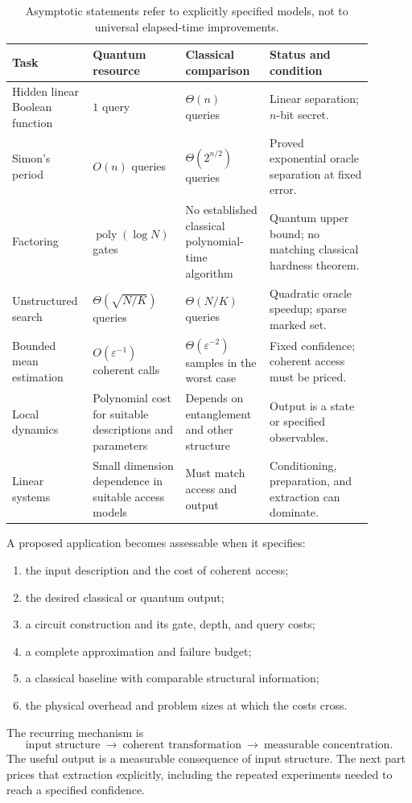 \documentclass[11pt,a4paper]{article}
\newcommand{\poly}{\operatorname{poly}}
\theoremstyle{definition}
\theoremstyle{remark}
\numberwithin{equation}{section}
\begin{document}
\begin{table}[htbp]
\centering
\small
\renewcommand{\arraystretch}{1.23}
\begin{tabular}{>{\raggedright\arraybackslash}p{0.18\linewidth}
>{\raggedright\arraybackslash}p{0.22\linewidth}
>{\raggedright\arraybackslash}p{0.22\linewidth}
>{\raggedright\arraybackslash}p{0.27\linewidth}}
\toprule
Task & Quantum resource & Classical comparison & Status and condition\\
\midrule
Hidden linear Boolean function
& $1$ query & $\Theta(n)$ queries
& Linear separation; $n$-bit secret.\\
Simon's period
& $O(n)$ queries & $\Theta(2^{n/2})$ queries
& Proved exponential oracle separation at fixed error.\\
Factoring
& $\poly(\log N)$ gates
& No established classical polynomial-time algorithm
& Quantum upper bound; no matching classical hardness theorem.\\
Unstructured search
& $\Theta(\sqrt{N/K})$ queries & $\Theta(N/K)$ queries
& Quadratic oracle speedup; sparse marked set.\\
Bounded mean estimation
& $O(\varepsilon^{-1})$ coherent calls
& $\Theta(\varepsilon^{-2})$ samples in the worst case
& Fixed confidence; coherent access must be priced.\\
Local dynamics
& Polynomial cost for suitable descriptions and parameters
& Depends on entanglement and other structure
& Output is a state or specified observables.\\
Linear systems
& Small dimension dependence in suitable access models
& Must match access and output
& Conditioning, preparation, and extraction can dominate.\\
\bottomrule
\end{tabular}
\caption{Asymptotic statements refer to explicitly specified models, not to
universal elapsed-time improvements.}
\label{tab:map}
\end{table}

A proposed application becomes assessable when it specifies:
\begin{enumerate}
 \item the input description and the cost of coherent access;
 \item the desired classical or quantum output;
 \item a circuit construction and its gate, depth, and query costs;
 \item a complete approximation and failure budget;
 \item a classical baseline with comparable structural information;
 \item the physical overhead and problem sizes at which the costs cross.
\end{enumerate}
The recurring mechanism is
\begin{equation}
 \text{input structure}\ \longrightarrow\
 \text{coherent transformation}\ \longrightarrow\
 \text{measurable concentration}.
\end{equation}
The useful output is a measurable consequence of input structure.
The next part prices that extraction explicitly, including the repeated
experiments needed to reach a specified confidence.
\end{document}
